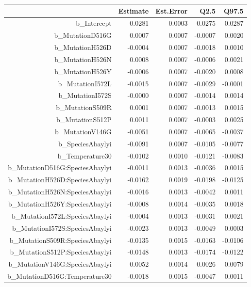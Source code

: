 \begin{table}[ht]
\centering
\begingroup\footnotesize
\begin{tabular}{rrrrr}
  \hline
 & Estimate & Est.Error & Q2.5 & Q97.5 \\ 
  \hline
b\_Intercept & 0.0281 & 0.0003 & 0.0275 & 0.0287 \\ 
  b\_MutationD516G & 0.0007 & 0.0007 & -0.0007 & 0.0020 \\ 
  b\_MutationH526D & -0.0004 & 0.0007 & -0.0018 & 0.0010 \\ 
  b\_MutationH526N & 0.0008 & 0.0007 & -0.0006 & 0.0021 \\ 
  b\_MutationH526Y & -0.0006 & 0.0007 & -0.0020 & 0.0008 \\ 
  b\_MutationI572L & -0.0015 & 0.0007 & -0.0029 & -0.0001 \\ 
  b\_MutationI572S & -0.0000 & 0.0007 & -0.0014 & 0.0014 \\ 
  b\_MutationS509R & 0.0001 & 0.0007 & -0.0013 & 0.0015 \\ 
  b\_MutationS512P & 0.0011 & 0.0007 & -0.0003 & 0.0025 \\ 
  b\_MutationV146G & -0.0051 & 0.0007 & -0.0065 & -0.0037 \\ 
  b\_SpeciesAbaylyi & -0.0091 & 0.0007 & -0.0105 & -0.0077 \\ 
  b\_Temperature30 & -0.0102 & 0.0010 & -0.0121 & -0.0083 \\ 
  b\_MutationD516G:SpeciesAbaylyi & -0.0011 & 0.0013 & -0.0036 & 0.0015 \\ 
  b\_MutationH526D:SpeciesAbaylyi & -0.0162 & 0.0019 & -0.0198 & -0.0125 \\ 
  b\_MutationH526N:SpeciesAbaylyi & -0.0016 & 0.0013 & -0.0042 & 0.0011 \\ 
  b\_MutationH526Y:SpeciesAbaylyi & -0.0008 & 0.0014 & -0.0035 & 0.0018 \\ 
  b\_MutationI572L:SpeciesAbaylyi & -0.0004 & 0.0013 & -0.0031 & 0.0021 \\ 
  b\_MutationI572S:SpeciesAbaylyi & -0.0023 & 0.0013 & -0.0049 & 0.0003 \\ 
  b\_MutationS509R:SpeciesAbaylyi & -0.0135 & 0.0015 & -0.0163 & -0.0106 \\ 
  b\_MutationS512P:SpeciesAbaylyi & -0.0148 & 0.0013 & -0.0174 & -0.0122 \\ 
  b\_MutationV146G:SpeciesAbaylyi & 0.0052 & 0.0014 & 0.0026 & 0.0079 \\ 
  b\_MutationD516G:Temperature30 & -0.0018 & 0.0015 & -0.0047 & 0.0011 \\ 

\end{tabular}
\end{table}
